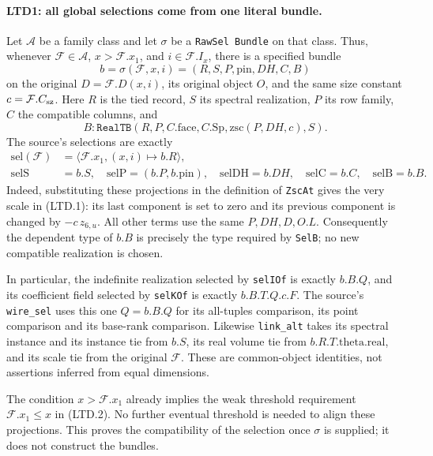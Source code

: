 \paragraph{LTD1: all global selections come from one literal bundle.}
\label{claim:LTD1}
Let \(\mathcal A\) be a family class and let \(\sigma\) be a
\texttt{RawSel Bundle} on that class.  Thus, whenever
\(\mathcal F\in\mathcal A\), \(x>\mathcal F.x_1\), and
\(i\in\mathcal F.I_x\), there is a specified bundle
\[
 b=\sigma(\mathcal F,x,i)
  =(R,S,P,\mathrm{pin},DH,C,B)
\]
on the original \(D=\mathcal F.D(x,i)\), its original object \(O\),
and the same size constant \(c=\mathcal F.C_{\rm sz}\).
Here \(R\) is the tied record, \(S\) its spectral realization,
\(P\) its row family, \(C\) the compatible columns, and
\[
 B:\texttt{RealTB}
   (R,P,C.\mathrm{face},C.\mathrm{Sp},
                 \mathrm{zsc}(P,DH,c),S).
 \tag{LTD.1}
\]
The source's selections are exactly
\[
 \begin{split}
 \mathrm{sel}(\mathcal F)&=
   \bigl\langle\mathcal F.x_1,
           (x,i)\longmapsto b.R\bigr\rangle,\\
 \mathrm{selS}&=b.S,\quad \mathrm{selP}=(b.P,b.\mathrm{pin}),\quad
 \mathrm{selDH}=b.DH,\quad \mathrm{selC}=b.C,\quad
 \mathrm{selB}=b.B.
 \end{split}                                                    \tag{LTD.2}
\]
Indeed, substituting these projections in the definition of
\texttt{ZscAt} gives the very scale in (LTD.1): its last component
is set to zero and its previous component is changed by
\(-c\,z_{6,u}\).  All other terms use the same \(P,DH,D,O.L\).
Consequently the dependent type of \(b.B\) is precisely the type
required by \texttt{SelB}; no new compatible realization is chosen.

In particular, the indefinite realization selected by
\texttt{selIOf} is exactly \(b.B.Q\), and its coefficient field
selected by \texttt{selKOf} is exactly \(b.B.T.Q.c.F\).
The source's \texttt{wire\_sel} uses this one \(Q=b.B.Q\) for its
all-tuples comparison, its point comparison and its base-rank
comparison.  Likewise \texttt{link\_alt} takes its spectral
instance and its instance tie from \(b.S\), its real volume tie
from \(b.R.T.\mathrm{theta.real}\), and its scale tie from the
original \(\mathcal F\).  These are common-object identities, not
assertions inferred from equal dimensions.

The condition \(x>\mathcal F.x_1\) already implies the weak
threshold requirement \(\mathcal F.x_1\le x\) in (LTD.2).
No further eventual threshold is needed to align these projections.
This proves the compatibility of the selection once \(\sigma\)
is supplied; it does not construct the bundles.

